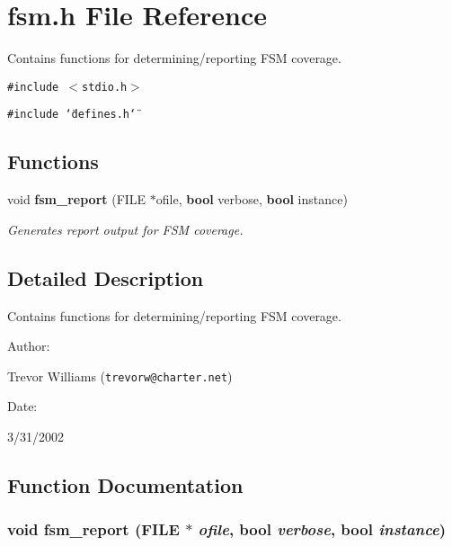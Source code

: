 \section{fsm.h File Reference}
\label{fsm_8h}
Contains functions for determining/reporting FSM coverage. 


{\tt \#include $<$stdio.h$>$}\par
{\tt \#include \char`\"{}defines.h\char`\"{}}\par
\subsection*{Functions}
\begin{CompactItemize}
\item 
void {\bf fsm\_\-report} (FILE $\ast$ofile, {\bf bool} verbose, {\bf bool} instance)
\begin{CompactList}\small\item\em Generates report output for FSM coverage.\item\end{CompactList}\end{CompactItemize}


\subsection{Detailed Description}
Contains functions for determining/reporting FSM coverage.



\begin{Desc}
\item[Author: ]\par
Trevor Williams ({\tt trevorw@charter.net}) \end{Desc}
\begin{Desc}
\item[Date: ]\par
3/31/2002\end{Desc}


\subsection{Function Documentation}
\subsubsection{\setlength{\rightskip}{0pt plus 5cm}void fsm\_\-report (FILE $\ast$ {\em ofile}, {\bf bool} {\em verbose}, {\bf bool} {\em instance})}\label{fsm_8h_a0}


